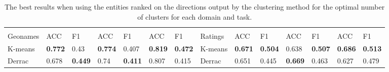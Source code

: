 {\begin{landscape}
\begin{table}[]
\begin{tabular}{llllllllllllll}
&                                 &                                 &                                 &                                 &                                 &                                 &                                &                                 &                                 &                                 &                                 &                                 &                            \\
Geonames    & ACC                             & F1                              & ACC                             & F1                              & ACC                             & F1                              & Ratings                        & ACC                             & F1                              & ACC                             & F1                              & ACC                             & F1                       \\
\toprule
K-means     & \textbf{0.772} & 0.43                            & \textbf{0.774} & 0.407                           & \textbf{0.819} & \textbf{0.472} & K-means                        & \textbf{0.671} & \textbf{0.504} & 0.638                           & \textbf{0.507} & \textbf{0.686} & \textbf{0.513}       \\

Derrac      & 0.678                           & \textbf{0.449} & 0.74                            & \textbf{0.411} & 0.807                           & 0.415                           & Derrac                         & 0.651                           & 0.445                           & \textbf{0.669} & 0.463                           & 0.627                           & 0.479                 
	\end{tabular}
\centering
\caption{The best results when using the entities ranked on the directions output by the clustering method for the optimal number of clusters for each domain and task.}
\end{table}
\end{landscape}
}


